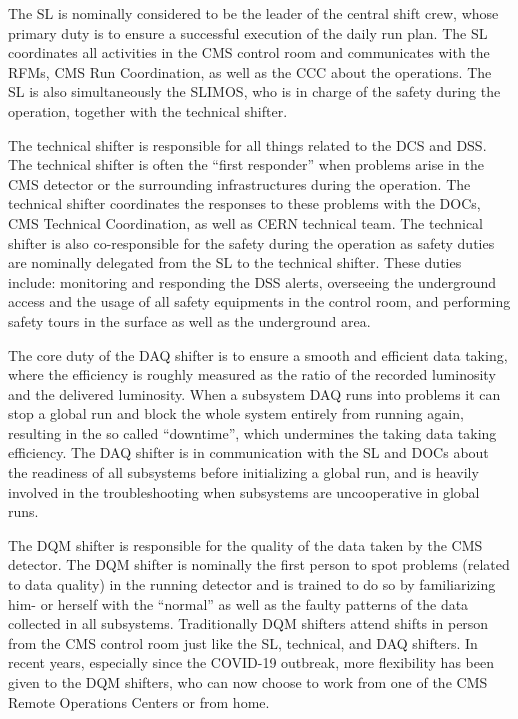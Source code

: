 The \ac{SL} is nominally considered to be the leader of the central shift crew, whose primary duty is to ensure a successful execution of the daily run plan. The \ac{SL} coordinates all activities in the \ac{CMS} control room and communicates with the \acp{RFM}, \ac{CMS} Run Coordination, as well as the \ac{CCC} about the operations. The \ac{SL} is also simultaneously the \ac{SLIMOS}, who is in charge of the safety during the operation, together with the technical shifter. 

The technical shifter is responsible for all things related to the \ac{DCS} and \ac{DSS}. The technical shifter is often the ``first responder'' when problems arise in the \ac{CMS} detector or the surrounding infrastructures during the operation. The technical shifter coordinates the responses to these problems with the \acp{DOC}, \ac{CMS} Technical Coordination, as well as \ac{CERN} technical team. The technical shifter is also co-responsible for the safety during the operation as safety duties are nominally delegated from the \ac{SL} to the technical shifter. These duties include: monitoring and responding the \ac{DSS} alerts, overseeing the underground access and the usage of all safety equipments in the control room, and performing safety tours in the surface as well as the underground area. 

The core duty of the \ac{DAQ} shifter is to ensure a smooth and efficient data taking, where the efficiency is roughly measured as the ratio of the recorded luminosity and the delivered luminosity. When a subsystem \ac{DAQ}  runs into problems it can stop a global run and block the whole system entirely from running again, resulting in the so called ``downtime'', which undermines the taking data taking efficiency. The \ac{DAQ} shifter is in communication with the \ac{SL} and \acp{DOC} about the readiness of all subsystems before initializing a global run, and is heavily involved in the troubleshooting when subsystems are uncooperative in global runs.

The \ac{DQM} shifter is responsible for the quality of the data taken by the \ac{CMS} detector. The \ac{DQM} shifter is nominally the first person to spot problems (related to data quality) in the running detector and is trained to do so by familiarizing him- or herself with the ``normal'' as well as the faulty patterns of the data collected in all subsystems. Traditionally \ac{DQM} shifters attend shifts in person from the \ac{CMS} control room just like the \ac{SL}, technical, and \ac{DAQ} shifters. In recent years, especially since the COVID-19 outbreak, more flexibility has been given to the \ac{DQM} shifters, who can now choose to work from one of the \ac{CMS} Remote Operations Centers or from home.

